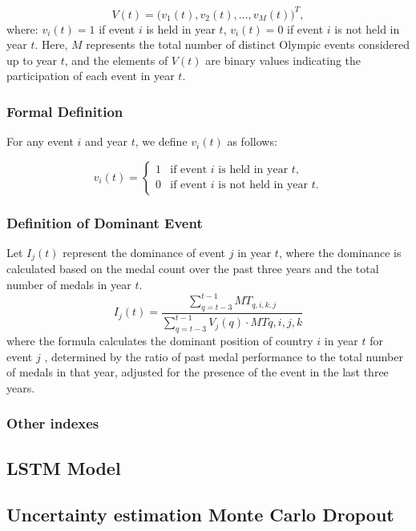 \documentclass{mcmthesis}
\begin{document}
\[
V(t) = \big( v_1(t), v_2(t), \dots, v_M(t) \big)^T,
\]
where: \( v_i(t) = 1 \) if event \( i \) is held in year \( t \),
\( v_i(t) = 0 \) if event \( i \) is not held in year \( t \). Here, \( M \) represents the total number of distinct Olympic events considered up to year \( t \), and the elements of \( V(t) \) are binary values indicating the participation of each event in year \( t \).

\subsubsection{Formal Definition}

For any event \( i \) and year \( t \), we define \( v_i(t) \) as follows:

\[
v_i(t) =
\begin{cases}
	1 & \text{if event } i \text{ is held in year } t, \\
	0 & \text{if event } i \text{ is not held in year } t.
\end{cases}
\]


\subsubsection{Definition of Dominant Event}

Let \( I_j(t) \) represent the dominance of event \( j \) in year \( t \), where the dominance is calculated based on the medal count over the past three years and the total number of medals in year \( t \).
\[
I_j(t) = \frac{\sum_{q=t-3}^{t-1} MT_{q,i,k,j}}{\sum_{q=t-3}^{t-1}V_j(q) \cdot MT{q,i,j,k}} 
\]
where the formula calculates the dominant position of country $i$ in year  $t$  for event  $j$ , determined by the ratio of past medal performance to the total number of medals in that year, adjusted for the presence of the event in the last three years.







\subsubsection{Other indexes}




\subsection{LSTM Model}

\subsection{Uncertainty estimation Monte Carlo Dropout}
\end{document}
